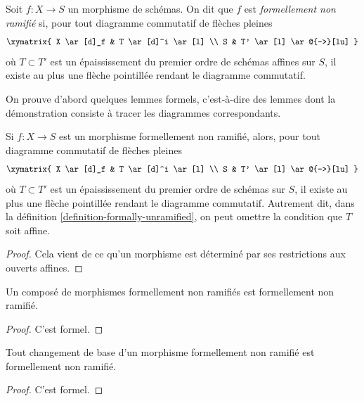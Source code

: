 \begin{definition}
\label{definition-formally-unramified}
Soit $f : X \to S$ un morphisme de schémas.
On dit que $f$ est {\it formellement non ramifié} si, pour tout diagramme commutatif de flèches pleines
$$
\xymatrix{
X \ar[d]_f & T \ar[d]^i \ar[l] \\
S & T' \ar[l] \ar@{-->}[lu]
}
$$
où $T \subset T'$ est un épaississement du premier ordre de schémas affines sur $S$,
il existe au plus une flèche pointillée rendant le diagramme commutatif.
\end{definition}

\noindent
On prouve d'abord quelques lemmes formels, c'est-à-dire des lemmes dont la démonstration
consiste à tracer les diagrammes correspondants.

\begin{lemma}
\label{lemma-formally-unramified-not-affine}
Si $f : X \to S$ est un morphisme formellement non ramifié, alors, pour
tout diagramme commutatif de flèches pleines
$$
\xymatrix{
X \ar[d]_f & T \ar[d]^i \ar[l] \\
S & T' \ar[l] \ar@{-->}[lu]
}
$$
où $T \subset T'$ est un épaississement du premier ordre de schémas sur $S$,
il existe au plus une flèche pointillée rendant le diagramme commutatif.
Autrement dit, dans
la définition \ref{definition-formally-unramified},
on peut omettre la condition que $T$ soit affine.
\end{lemma}

\begin{proof}
Cela vient de ce qu'un morphisme est déterminé par ses restrictions
aux ouverts affines.
\end{proof}

\begin{lemma}
\label{lemma-composition-formally-unramified}
Un composé de morphismes formellement non ramifiés est formellement non ramifié.
\end{lemma}

\begin{proof}
C'est formel.
\end{proof}

\begin{lemma}
\label{lemma-base-change-formally-unramified}
Tout changement de base d'un morphisme formellement non ramifié est formellement non ramifié.
\end{lemma}

\begin{proof}
C'est formel.
\end{proof}

